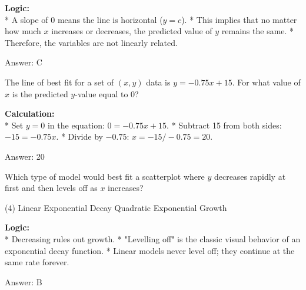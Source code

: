 \documentclass[11pt,paper=a4,answers]{exam}
\begin{document}
\begin{questions}
\begin{solution}
\textbf{Logic:} \\
* A slope of 0 means the line is horizontal ($y = c$).
* This implies that no matter how much $x$ increases or decreases, the predicted value of $y$ remains the same.
* Therefore, the variables are not linearly related.

\vspace{30pt}

Answer: \colorbox{yellow!100}{C}
\end{solution}

\vspace{60pt}

\question
The line of best fit for a set of $(x, y)$ data is $y = -0.75x + 15$. For what value of $x$ is the predicted $y$-value equal to 0?

\begin{solution}
\textbf{Calculation:} \\
* Set $y = 0$ in the equation: $0 = -0.75x + 15$.
* Subtract 15 from both sides: $-15 = -0.75x$.
* Divide by $-0.75$: $x = -15 / -0.75 = 20$.

\vspace{30pt}

Answer: \colorbox{yellow!100}{20}
\end{solution}

\vspace{60pt}

\question

Which type of model would best fit a scatterplot where $y$ decreases rapidly at first and then levels off as $x$ increases?
\begin{tasks}(4)
    \task Linear
    \task Exponential Decay
    \task Quadratic
    \task Exponential Growth
\end{tasks}

\begin{solution}
\textbf{Logic:} \\
* Decreasing rules out growth.
* "Levelling off" is the classic visual behavior of an exponential decay function.
* Linear models never level off; they continue at the same rate forever.

\vspace{30pt}

Answer: \colorbox{yellow!100}{B}
\end{solution}


\end{questions}
\end{document}

